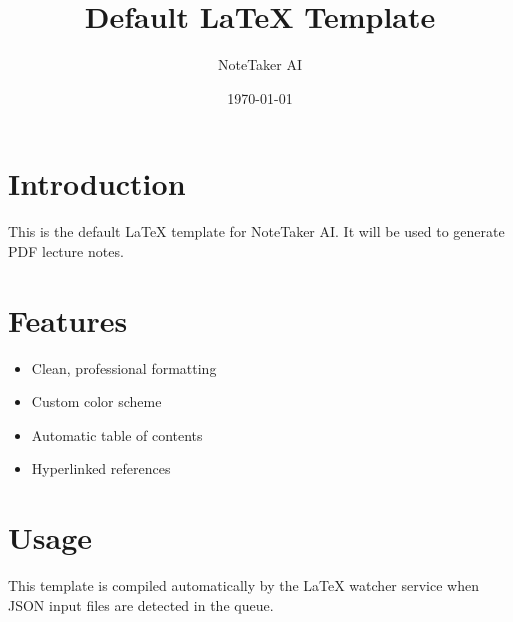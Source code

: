 \documentclass[11pt]{article}
\begin{document}
\title{Default LaTeX Template}
\author{NoteTaker AI}
\date{\today}
\maketitle

\section{Introduction}

This is the default LaTeX template for NoteTaker AI. It will be used to generate PDF lecture notes.

\section{Features}

\begin{itemize}
  \item Clean, professional formatting
  \item Custom color scheme
  \item Automatic table of contents
  \item Hyperlinked references
\end{itemize}

\section{Usage}

This template is compiled automatically by the LaTeX watcher service when JSON input files are detected in the queue.
\end{document}
